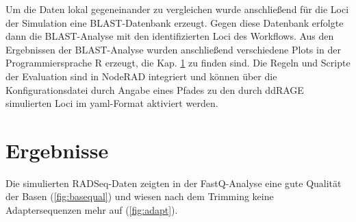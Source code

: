 Um die Daten lokal gegeneinander zu vergleichen wurde anschließend für die Loci der Simulation eine BLAST-Datenbank erzeugt. Gegen diese Datenbank erfolgte dann die BLAST-Analyse mit den identifizierten Loci des Workflows. Aus den Ergebnissen der BLAST-Analyse wurden anschließend verschiedene Plots in der Programmiersprache R erzeugt, die Kap. \ref{sec:res} zu finden sind. Die Regeln und Scripte der Evaluation sind in NodeRAD integriert und können über die Konfigurationsdatei durch Angabe eines Pfades zu den durch ddRAGE simulierten Loci im yaml-Format aktiviert werden.

\section{Ergebnisse} \label{sec:res}

Die simulierten RADSeq-Daten zeigten in der FastQ-Analyse eine gute Qualität der Basen (\autoref{fig:basequal}) und wiesen nach dem Trimming keine Adaptersequenzen mehr auf (\autoref{fig:adapt}).\\

